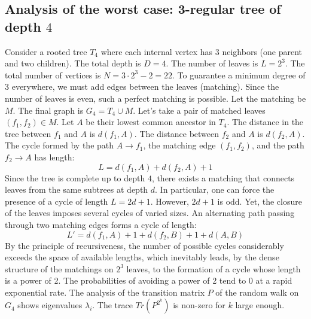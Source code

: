 \documentclass[12pt,a4paper]{article}
\begin{document}
\subsection{Analysis of the worst case: 3-regular tree of depth $4$}
Consider a rooted tree $T_{4}$ where each internal vertex has 3 neighbors (one parent and two children).
The total depth is $D = 4$.
The number of leaves is $L = 2^{3}$.
The total number of vertices is $N = 3 \cdot 2^{3} - 2 = 22$.
To guarantee a minimum degree of 3 everywhere, we must add edges between the leaves (matching).
Since the number of leaves is even, such a perfect matching is possible.
Let the matching be $M$. The final graph is $G_{4} = T_{4} \cup M$.
Let's take a pair of matched leaves $(f_1, f_2) \in M$.
Let $A$ be their lowest common ancestor in $T_{4}$.
The distance in the tree between $f_1$ and $A$ is $d(f_1, A)$.
The distance between $f_2$ and $A$ is $d(f_2, A)$.
The cycle formed by the path $A \to f_1$, the matching edge $(f_1, f_2)$, and the path $f_2 \to A$ has length:
$$ L = d(f_1, A) + d(f_2, A) + 1 $$
Since the tree is complete up to depth $4$, there exists a matching that connects leaves from the same subtrees at depth $d$.
In particular, one can force the presence of a cycle of length $L = 2d + 1$. However, $2d+1$ is odd.
Yet, the closure of the leaves imposes several cycles of varied sizes. An alternating path passing through two matching edges forms a cycle of length:
$$ L' = d(f_1, A) + 1 + d(f_2, B) + 1 + d(A, B) $$
By the principle of recursiveness, the number of possible cycles considerably exceeds the space of available lengths, which inevitably leads, by the dense structure of the matchings on $2^{3}$ leaves, to the formation of a cycle whose length is a power of 2. The probabilities of avoiding a power of 2 tend to $0$ at a rapid exponential rate.
The analysis of the transition matrix $P$ of the random walk on $G_{4}$ shows eigenvalues $\lambda_i$. The trace $Tr(P^{2^k})$ is non-zero for $k$ large enough.
\end{document}
